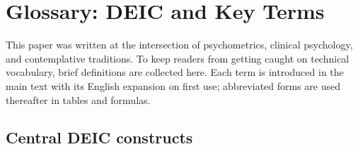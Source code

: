 \section*{Glossary: DEIC and Key Terms}
\label{sec:glossary}

This paper was written at the intersection of psychometrics, clinical psychology, and contemplative traditions. To keep readers from getting caught on technical vocabulary, brief definitions are collected here. Each term is introduced in the main text with its English expansion on first use; abbreviated forms are used thereafter in tables and formulas.

\subsection*{Central DEIC constructs}

